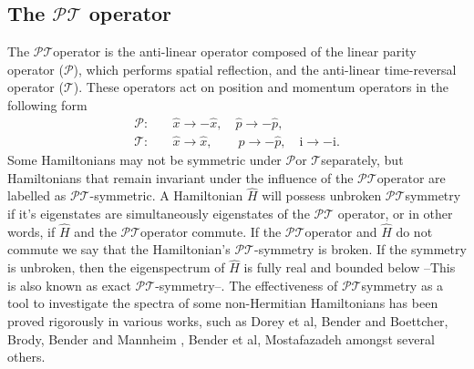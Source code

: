 \documentclass[12pt, a4paper]{report}
\newcommand\PT{\(\mathcal{PT}\)}
\newcommand\PP{\(\mathcal{P}\)}
\newcommand\TT{\(\mathcal{T}\)}
\begin{document}
\subsection{The \texorpdfstring{$\mathcal{PT}$}\: operator}
The \PT\:operator is the anti-linear operator composed of the linear parity operator (\PP), which performs spatial reflection, and the anti-linear time-reversal operator (\TT). These operators act on position and momentum operators in the following form
\begin{equation}\label{eq:2}
\begin{split}
\mathcal{P}:& \quad\hat{x} \rightarrow -\hat{x},\quad \hat{p} \rightarrow -\hat{p},\\
\mathcal{T}:& \quad\hat{x} \rightarrow \hat{x},\quad\quad \hat{p} \rightarrow -\hat{p},\quad \mathrm{i} \rightarrow -\mathrm{i}.
\end{split}
\end{equation}
Some Hamiltonians may not be symmetric under \PP\:or \TT\:separately, but Hamiltonians that remain invariant under the influence of the \PT\:operator are labelled as \PT-symmetric. A Hamiltonian $\hat{H}$ will possess unbroken \PT\:symmetry if it's eigenstates are simultaneously eigenstates of the \PT\: operator, or in other words, if $\hat{H}$ and the \PT\:operator commute. If the \PT\:operator and $\hat{H}$ do not commute we say that the Hamiltonian's \PT-symmetry is broken\cite{MakingSense}\cite{ComplexExtension}\cite{MustaHbeHermitian}. If the symmetry is unbroken, then the eigenspectrum of $\hat{H}$ is fully real and bounded below --This is also known as exact \PT-symmetry--. The effectiveness of \PT\:symmetry as a tool to investigate the spectra of some non-Hermitian Hamiltonians has been proved rigorously in various works, such as Dorey et al\cite{Dorey_2001}, Bender and Boettcher\cite{Bender1998}, Brody\cite{Brody_2016}, Bender and Mannheim \cite{Bender_2010}, Bender et al\cite{PT-symmetricQM}, Mostafazadeh\cite{Mostafazadeh}\cite{Mostafazadeh2} amongst several others. 

\end{document}
